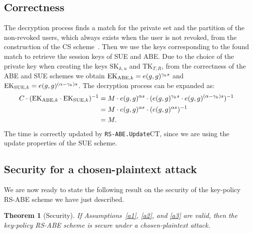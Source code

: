 \documentclass[a4paper,10pt]{article}
\newtheorem{theorem}{Theorem}
\newcommand{\bigO}[1]{\mathcal{O}\left( #1 \right)}
\newcommand{\adv}{\textbf{Adv}}
\newcommand{\algorithm}[2]{\texttt{#1.#2}}
\begin{document}
	\subsection{Correctness}\label{subsec:cor}
	The decryption process finds a match for the private set and the partition of the non-revoked users, which always exists when the user is not revoked, from the construction of the CS scheme~\cite{naor2001SC}. Then we use the keys corresponding to the found match to retrieve the session keys of SUE and ABE. Due to the choice of the private key when creating the keys $\mathit{\mathrm{SK}}_{\mathbb{A},u}$ and $\mathit{\mathrm{TK}}_{T,R}$, from the correctness of the ABE and SUE schemes we obtain $\mathrm{EK}_{\textnormal{ABE},k}=e(g,g)^{\gamma_{k}s}$ and $\mathrm{EK}_{\textnormal{SUE},k}=e(g,g)^{(\alpha - \gamma_{k})s}$.
	The decryption process can be expanded as:
	\begin{align*}
		C\cdot (\mathrm{EK}_{\textnormal{ABE},k}\cdot \mathrm{EK}_{\textnormal{SUE},k})^{-1}&= M \cdot e(g,g)^{\alpha s} \cdot (e(g,g)^{\gamma_{k}s} \cdot e(g,g)^{(\alpha - \gamma_{k})s})^{-1}\\
		&= M \cdot e(g,g)^{\alpha s} \cdot (e(g,g)^{\alpha s})^{-1}\\
		&=M.
	\end{align*}
	The time is correctly updated by \algorithm{RS-ABE}{Update$\mathrm{CT}$}, since we are using the update properties of the SUE scheme.


	\subsection{Security for a chosen-plaintext attack}
	\label{security_section}
	We are now ready to state the following result on the security of the key-policy RS-ABE scheme we have just described.
	
	\begin{theorem}[Security]
	\label{RS-ABE_security_th}
	If Assumptions~\ref{a1}, \ref{a2}, and \ref{a3} are valid, then the key-policy RS-ABE scheme is secure under a chosen-plaintext attack.
	\begin{comment}
	Moreover, the advantage of the RS-ABE scheme is restrained by the inequality
	\[
		\adv_{\mathcal{A}}^{\textnormal{RS-ABE}}(\lambda) \leq
			\adv_{\mathcal{A}}^{\text{A1}}(\lambda) +
			\bigO{q\cdot r_\textnormal{max}\cdot \log_2\left( N_{\textnormal{max}} \right)}\adv_{\mathcal{A}}^{\text{A2}}(\lambda) +
			\adv_{\mathcal{A}}^{\text{A3}}(\lambda),
	\]
	where $\mathcal{A}$ is a PPT adversary who queries at most $q$ between private and update keys, $N_{\textnormal{max}}$ is the maximum number of users, $r_{\textnormal{max}}$ is the maximum size of a set of revoked users
	\end{comment}
	\end{theorem}
	
\end{document}

